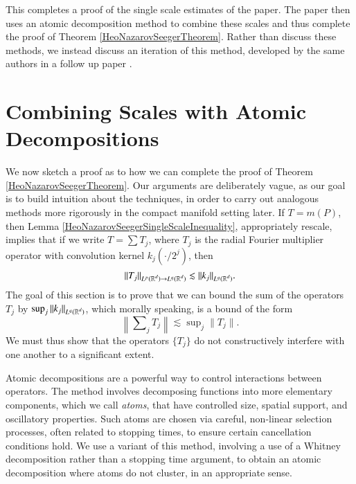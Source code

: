This completes a proof of the single scale estimates of the paper. The paper then uses an atomic decomposition method to combine these scales and thus complete the proof of Theorem \ref{HeoNazarovSeegerTheorem}. Rather than discuss these methods, we instead discuss an iteration of this method, developed by the same authors in a follow up paper \cite{HeoandNazarovandSeeger2}.

\section{Combining Scales with Atomic Decompositions} \label{sec:combiningscaleswithatomicdecompositions}

We now sketch a proof as to how we can complete the proof of Theorem \ref{HeoNazarovSeegerTheorem}. Our arguments are deliberately vague, as our goal is to build intuition about the techniques, in order to carry out analogous methods more rigorously in the compact manifold setting later. If $T = m(P)$, then Lemma \ref{HeoNazarovSeegerSingleScaleInequality}, appropriately rescale, implies that if we write $T = \sum T_j$, where $T_j$ is the radial Fourier multiplier operator with convolution kernel $k_j(\cdot/2^j)$, then
%
\begin{equation} \label{individualscaleoperatorbound}
    \| T_j \|_{L^p(\operatorname{\mathbb{R}}^d) \to L^q(\operatorname{\mathbb{R}}^d)} \lesssim \| k_j \|_{L^q(\operatorname{\mathbb{R}}^d)}.
\end{equation}
%
The goal of this section is to prove that we can bound the sum of the operators $T_j$ by $\sup_j \| k_j \|_{L^q(\operatorname{\mathbb{R}}^d)}$, which morally speaking, is a bound of the form
%
\begin{equation}
  \left\| \sum\nolimits_j T_j \right\| \lesssim \sup\nolimits_j \| T_j \|.
\end{equation}
%
We must thus show that the operators $\{ T_j \}$ do not constructively interfere with one another to a significant extent.

Atomic decompositions are a powerful way to control interactions between operators. The method involves decomposing functions into more elementary components, which we call \emph{atoms}, that have controlled size, spatial support, and oscillatory properties. Such atoms are chosen via careful, non-linear selection processes, often related to stopping times, to ensure certain cancellation conditions hold. We use a variant of this method, involving a use of a Whitney decomposition rather than a stopping time argument, to obtain an atomic decomposition where atoms do not cluster, in an appropriate sense.

